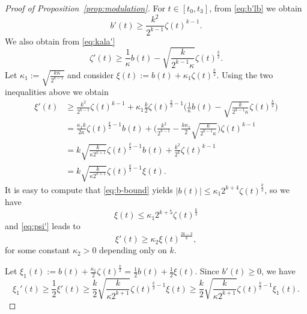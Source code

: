 \documentclass[10pt,reqno]{amsart}
\numberwithin{equation}{section}
\theoremstyle{remark}
\newcommand{\0}{\emptyset}
\begin{document}
\begin{proof}[Proof of Proposition~\ref{prop:modulation}]
For $t \in [t_0, t_3]$, from \eqref{eq:b'lb} we obtain
\begin{equation}
\label{eq:b'lb2}
b'(t) \geq \frac{k^2}{2^{k-1}}\zeta(t)^{k-1}.
\end{equation}
We also obtain from \eqref{eq:kala'}
\begin{equation}
\zeta'(t) \geq \frac{1}{\kappa}b(t) - \sqrt{\frac{k}{2^{k-1}\kappa}}\zeta(t)^\frac k2.
\end{equation}
Let $\kappa_1 := \sqrt{\frac{k\kappa}{2^{k-1}}}$ and consider $\xi(t) := b(t) + \kappa_1 \zeta(t)^\frac k2$.
Using the two inequalities above we obtain
\begin{equation}
\label{eq:psi'}
\begin{aligned}
\xi'(t) &\geq \frac{k^2}{2^{k-1}}\zeta(t)^{k-1} + \kappa_1 \frac k2 \zeta(t)^{\frac k2 - 1}
\Big(\frac{1}{\kappa}b(t) - \sqrt{\frac{k}{2^{k-1}\kappa}}\zeta(t)^\frac k2\Big) \\
& = \frac{\kappa_1 k}{2\kappa}\zeta(t)^{\frac k2 - 1}b(t)
+ \Big(\frac{k^2}{2^{k-1}}-\frac{k\kappa_1}{2}\sqrt{
\frac{k}{2^{k-1}\kappa}}\Big)\zeta(t)^{k-1} \\
&= k\sqrt{\frac{k}{\kappa 2^{k+1}}}\zeta(t)^{\frac k2 - 1}b(t)
+ \frac{k^2}{2^k}\zeta(t)^{k-1} \\
&= k\sqrt{\frac{k}{\kappa 2^{k+1}}}\zeta(t)^{\frac k2 - 1}\xi(t).
\end{aligned}
\end{equation}
It is easy to compute that \eqref{eq:b-bound} yields $|b(t)| \leq \kappa_1 2^{k+4}\zeta(t)^\frac k2$,
so we have
\begin{equation}
\label{eq:psi-bound}
\xi(t) \leq \kappa_1 2^{k+5}\zeta(t)^\frac k2
\end{equation}
and \eqref{eq:psi'} leads to
\begin{equation}
\label{eq:psi'2}
\xi'(t) \geq \kappa_2 \xi(t)^\frac{2k-2}{k},
\end{equation}
for some constant $\kappa_2 > 0$ depending only on $k$.

Let $\xi_1(t) := b(t) + \frac{\kappa_1}{2}\zeta(t)^\frac k2 = \frac 12 b(t) + \frac 12 \xi(t)$.
Since $b'(t) \geq 0$, we have
\begin{equation}
\label{eq:psi1'}
\xi_1'(t) \geq \frac 12 \xi'(t) \geq \frac k2 \sqrt{\frac{k}{\kappa 2^{k+1}}}\zeta(t)^{\frac k2 - 1}\xi(t) \geq \frac k2 \sqrt{\frac{k}{\kappa 2^{k+1}}}\zeta(t)^{\frac k2 - 1}\xi_1(t).
\end{equation}


\end{proof}
\end{document}
